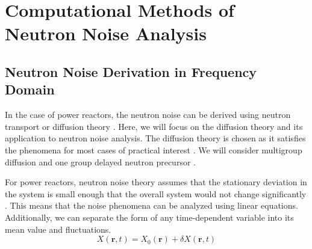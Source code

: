 \section{Computational Methods of Neutron Noise Analysis}
\subsection{Neutron Noise Derivation in Frequency Domain}
\label{sec:noise_derivation}

In the case of power reactors, the neutron noise can be derived using neutron transport or diffusion theory \cite{bahramiNewApproachCalculation2020, demaziereDevelopment2D2group2004}. Here, we will focus on the diffusion theory and its application to neutron noise analysis. The diffusion theory is chosen as it satisfies the phenomena for most cases of practical interest  \cite{pazsitNoiseTechniquesNuclear2010}. We will consider multigroup diffusion and one group delayed neutron precursor \cite{pazsitNoiseTechniquesNuclear2010}. 

For power reactors, neutron noise theory assumes that the stationary deviation in the system is small enough that the overall system would not change significantly \cite{pazsitNoiseTechniquesNuclear2010}. This means that the noise phenomena can be analyzed using linear equations. Additionally, we can separate the form of any time-dependent variable into its mean value and fluctuations.
\begin{equation}
        X(\textbf{r}, t) = X_0 (\textbf{r}) + \delta X(\textbf{r}, t)
        \label{eq:fluctuation}
\end{equation}

